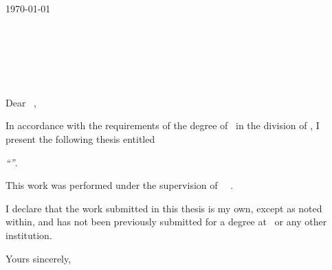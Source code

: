 \thispagestyle{plain}
\begin{flushright}
  \authorFirst\ \authorLast\\
  \medskip
  \authorContact
\end{flushright}

\vspace{3cm}
\today\vspace{1cm}\\
\headHonShort\ \headFirst\ \headLast\\
\headPos\\
\department\\
\institution\\
\location\\
\vspace{1cm}\\
Dear \headHonLong\ \headLast ,\medskip

In accordance with the requirements of the degree of \degree\ in the division of \major , I present the following thesis entitled \begin{center} \textit{``\documentTitle ''}. \end{center}  

This work was performed under the supervision of \superHon\ \superFirst\ \superLast .

I declare that the work submitted in this thesis is my own, except as noted within, and has not been previously submitted for a degree at \institution\ or any other institution.

\bigskip
\begin{flushright}
	Yours sincerely,\\
	\authorFirst\ \authorLast
\end{flushright}